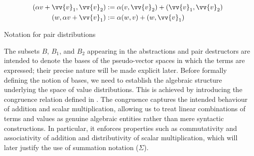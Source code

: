 \documentclass[runningheads,orivec,envcountsame,envcountsect]{llncs}
\def\Pair#1#2{(#1,#2)} %
\begin{document}
\begin{table}[tb]
  \begin{align*}
    \Pair{\alpha  v+\vv{v}_1}{\vv{v}_2} & :=
    \alpha\Pair{v}{\vv{v}_2} + \Pair{\vv{v}_1}{\vv{v}_2}\\
    \Pair{w}{\alpha  v+\vv{v}_1} &:= \alpha\Pair{w}{v} + \Pair{w}{\vv{v}_1}
  \end{align*}
  \caption{Notation for pair distributions}
  \label{tab:PairsNotation}
\end{table}

The subsets $B$, $B_1$, and $B_2$ appearing in the abstractions and pair
destructors are intended to denote the bases of the pseudo-vector spaces in
which the terms are expressed; their precise nature will be made explicit
later. Before formally defining the notion of bases, we need to establish the
algebraic structure underlying the space of value distributions. This is
achieved by introducing the congruence relation defined in
. The congruence captures the intended behaviour of
addition and scalar multiplication, allowing us to treat linear combinations of
terms and values as genuine algebraic entities rather than mere syntactic
constructions. In particular, it enforces properties such as commutativity and
associativity of addition and distributivity of scalar multiplication, which
will later justify the use of summation notation ($\Sigma$).
\end{document}
